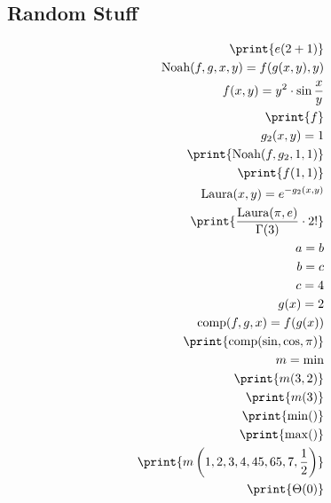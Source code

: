 \documentclass[oneside, a4paper]{article}
\begin{document}
\subsection*{Random Stuff}
\begin{program}
\begin{align*}
    \print{e(2+1)}\\
    \text{Noah}(f,g,x,y) = f(g(x, y), y)\\
    f(x,y) = y^2\cdot \sin{\frac{x}{y}}\\
    \print{f}\\
    g_2(x,y) = 1\\
    \print{\text{Noah}(f,g_2,1,1)}\\
    \print{f(1,1)}\\
    \text{Laura}(x,y) = e^{-g_2(x,y)}\\
    \print{\frac{\text{Laura}(\pi, e)}{\Gamma(3)}\cdot 2!}\\
    a = b\\
    b = c\\
    c = 4\\
    g(x) = 2\\
    \text{comp}(f,g,x) = f(g(x))\\
    \print{\text{comp}(\sin,\cos,\pi)}\\
    m = \min\\
    \print{m (3,2)}\\
    \print{m (3)}\\
    \print{\min ()}\\
    \print{\max ()}\\
    \print{m\left(1,2,3,4,45,65,7,\frac{1}{2}\right)}\\
    \print{\Theta(0)}\\
\end{align*}
\end{program}
\end{document}
